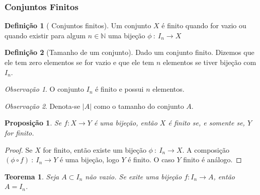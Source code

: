 \documentclass{article}
\newtheorem{prop}{Proposição}[section]
\theoremstyle{theorem}
\newtheorem{teo}{Teorema}
\theoremstyle{lemma}
\theoremstyle{definition}
\newtheorem{definicao}{Definição}[section]
\theoremstyle{remark}
\newtheorem{obs}{Observação}[section]
\begin{document}
\subsubsection{Conjuntos Finitos}
\begin{definicao}[ Conjuntos finitos]
	Um conjunto $X$ é finito quando for vazio ou quando existir para algum $n\in \mathbb{N}$ uma bijeção $\phi \: :\: I_n \to X$
\end{definicao}
\begin{definicao}[Tamanho de um conjunto]
	Dado um conjunto finito. Dizemos que ele tem zero elementos se for vazio e que ele tem $n$ elementos se tiver bijeção com $I_n$.
\end{definicao}
\begin{obs}
	O conjunto $I_n$ é finito e possui $n$ elementos. 
\end{obs}
\begin{obs}
	Denota-se $|A|$ como o tamanho do conjunto $A$.
\end{obs}
\begin{prop}
	Se $f:X\to Y$ é uma bijeção, então $X$ é finito se, e somente se, $Y$ for finito.
\end{prop}
\begin{proof}
	Se $X$ for finito, então existe um bijeção $\phi \: : \: I_n \to X$.  A composição $(\phi \circ f) \: : \: I_n \to Y$ é uma bijeção, logo $Y$ é finito. O caso $Y$ finito é análogo.
\end{proof}
\begin{teo}
	Seja $A\subset I_n$ não vazio. Se exite uma bijeção $f: I_n \to A$, então $A = I_n$.
	\label{TeoremaSubFinito}
\end{teo}
\end{document}
